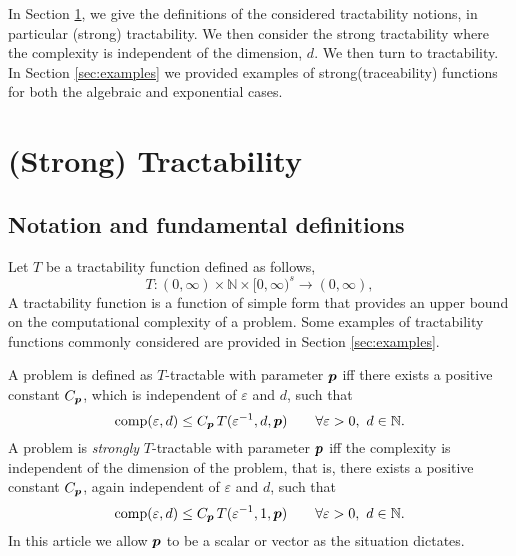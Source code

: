 \documentclass[11pt,a4paper]{article}
\newcommand{\peter}[1]{\begingroup\color{purple}#1\endgroup}
\newcommand{\kachi}[1]{\begingroup\color{ForestGreen}#1\endgroup}
\begin{document}
\kachi{In Section \ref{sec:spt}, we give the definitions of the considered tractability notions, in particular (strong) tractability. We then consider the strong tractability where the complexity is independent of the dimension, $d$. We then turn to tractability. In Section \ref{sec:examples} we provided examples of strong(traceability) functions for both the algebraic and exponential cases. }
 
\section{(Strong) Tractability}\label{sec:spt}

\subsection{Notation and fundamental definitions}
Let $T$ be a tractability function defined as follows,
\begin{equation} \label{eq:Tspec}
    T :(0,\infty) \times \mathbb{N} \times [0,\infty)^s \rightarrow (0,\infty),
\end{equation}
A tractability function is a function of simple form that provides an upper bound on the computational complexity of a problem.  Some examples of tractability functions commonly considered are provided in Section \ref{sec:examples}.


A problem is defined as $T$-tractable with parameter $\boldsymbol{p}$ iff there exists a positive constant $C_{\boldsymbol{p}}$, \peter{which is independent of $\varepsilon$ and $d$,} such that
\begin{equation} \label{eq:tract_def}
	\operatorname{comp}(\varepsilon,d) \le C_{\boldsymbol{p}}\, T(\varepsilon^{-1},d,\boldsymbol{p}) \qquad \forall \varepsilon >0, \ d \in \mathbb{N}.
\end{equation}
A problem is \emph{strongly}
$T$-tractable with parameter $\boldsymbol{p}$ iff the complexity is independent of the dimension of the problem, that is, there exists a positive constant $C_{\boldsymbol{p}}$, \peter{again independent of $\varepsilon$ and $d$,} such that
\begin{equation} \label{eq:strong_tract_def}
	\operatorname{comp}(\varepsilon,d) \le C_{\boldsymbol{p}}\, T(\varepsilon^{-1},1,\boldsymbol{p}) \qquad \forall \varepsilon >0 , \ d \in \mathbb{N}.
\end{equation}
In this article we allow $\boldsymbol{p}$ to be a scalar or vector as the situation dictates.
\end{document}

